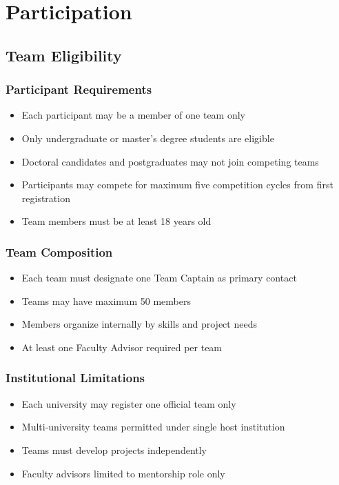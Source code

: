 
\renewcommand{\thesection}{P}
\section{Participation}

\subsection{Team Eligibility}

\subsubsection{Participant Requirements}
\begin{itemize}[noitemsep]
    \item Each participant may be a member of one team only
    \item Only undergraduate or master's degree students are eligible
    \item Doctoral candidates and postgraduates may not join competing teams
    \item Participants may compete for maximum five competition cycles from first registration
    \item Team members must be at least 18 years old
\end{itemize}

\subsubsection{Team Composition}
\begin{itemize}[noitemsep]
    \item Each team must designate one Team Captain as primary contact
    \item Teams may have maximum 50 members
    \item Members organize internally by skills and project needs
    \item At least one Faculty Advisor required per team
\end{itemize}

\subsubsection{Institutional Limitations}
\begin{itemize}[noitemsep]
    \item Each university may register one official team only
    \item Multi-university teams permitted under single host institution
    \item Teams must develop projects independently
    \item Faculty advisors limited to mentorship role only
\end{itemize}

